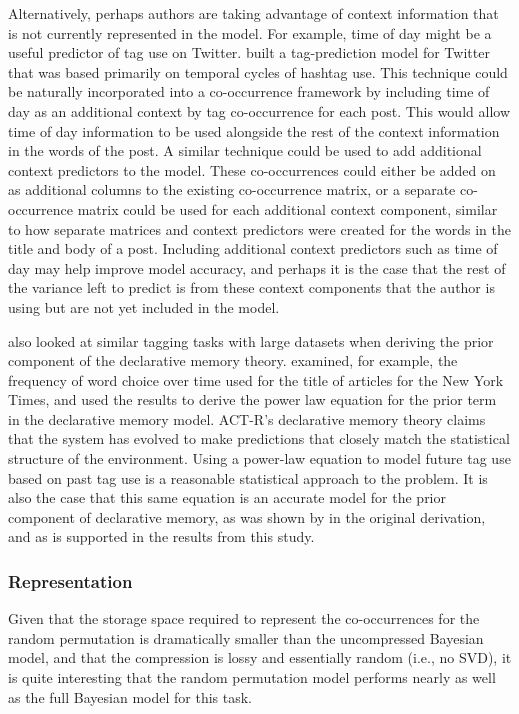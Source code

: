 \documentclass[man,floatsintext,donotrepeattitle]{apa6}
\begin{document}
Alternatively, perhaps authors are taking advantage of context information that is not currently represented in the model.
For example, time of day might be a useful predictor of tag use on Twitter.
\textcite{Cohn2012} built a tag-prediction model for Twitter that was based primarily on temporal cycles of hashtag use.
This technique could be naturally incorporated into a co-occurrence framework by including time of day as an additional context by tag co-occurrence for each post.
This would allow time of day information to be used alongside the rest of the context information in the words of the post.
A similar technique could be used to add additional context predictors to the model.
These co-occurrences could either be added on as additional columns to the existing co-occurrence matrix,
or a separate co-occurrence matrix could be used for each additional context component, similar to how separate matrices and context predictors were created for the words in the title and body of a post. 
Including additional context predictors such as time of day may help improve model accuracy,
and perhaps it is the case that the rest of the variance left to predict is from these context components that the author is using but are not yet included in the model.

\textcite{Anderson1991} also looked at similar tagging tasks with large datasets when deriving the prior component of the declarative memory theory.
\citeauthor{Anderson1991} examined, for example, the frequency of word choice over time used for the title of articles for the New York Times,
and used the results to derive the power law equation for the prior term in the declarative memory model.
ACT-R's declarative memory theory claims that the system has evolved to make predictions that closely match the statistical structure of the environment.
Using a power-law equation to model future tag use based on past tag use is a reasonable statistical approach to the problem.
It is also the case that this same equation is an accurate model for the prior component of declarative memory, as was shown by \citeauthor{Anderson1991} in the original derivation, 
and as is supported in the results from this study.

\subsubsection{Representation}

Given that the storage space required to represent the co-occurrences for the random permutation is dramatically smaller than the uncompressed Bayesian model,
and that the compression is lossy and essentially random (i.e., no SVD),
it is quite interesting that the random permutation model performs nearly as well as the full Bayesian model for this task.
\end{document}
